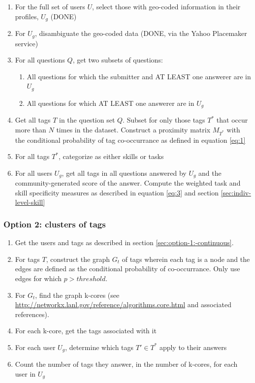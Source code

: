 \documentclass[11pt]{article}
\begin{document}
\begin{enumerate}
\item For the full set of users $U$, select those with geo-coded
  information in their profiles, $U_g$ (DONE)
\item For $U_g$, disambiguate the geo-coded data (DONE, via the Yahoo
  Placemaker service)
\item For all questions $Q$, get two subsets of questions:
  \begin{enumerate}
  \item All questions for which the submitter and AT LEAST one
    answerer are in $U_g$
  \item All questions for which AT LEAST one answerer are in $U_g$
  \end{enumerate}
\item Get all tags $T$ in the question set $Q$. Subset for only those
  tags $T^*$ that occur more than $N$ times in the dataset. Construct a
  proximity matrix $M_{T^*}$ with the conditional probability of tag
  co-occurrance as defined in equation \ref{eq:1}
\item For all tags $T^*$, categorize as either skills or tasks
\item For all users $U_g$, get all tags in all questions answered by
  $U_g$ and the community-generated score of the answer. Compute the
  weighted task and skill specificity measures as described in
  equation \ref{eq:3} and section \ref{sec:indiv-level-skill}
\end{enumerate}

\subsubsection{Option 2: clusters of tags}
\label{sec:option-2:-clusters}

\begin{enumerate}
\item Get the users and tags as described in section \ref{sec:option-1:-continuous}.
\item For tags $T$, construct the graph $G_t$ of tags wherein each tag is a
  node and the edges are defined as the conditional probability of
  co-occurrance. Only use edges for which $p > threshold$.
\item For $G_t$, find the graph k-cores (see
  \url{http://networkx.lanl.gov/reference/algorithms.core.html} and
  associated references).
\item For each k-core, get the tags associated with it
\item For each user $U_g$, determine which tags $T' \in T^*$ apply to
  their answers
\item Count the number of tags they answer, in the number of k-cores,
  for each user in $U_g$
\end{enumerate}
\end{document}
